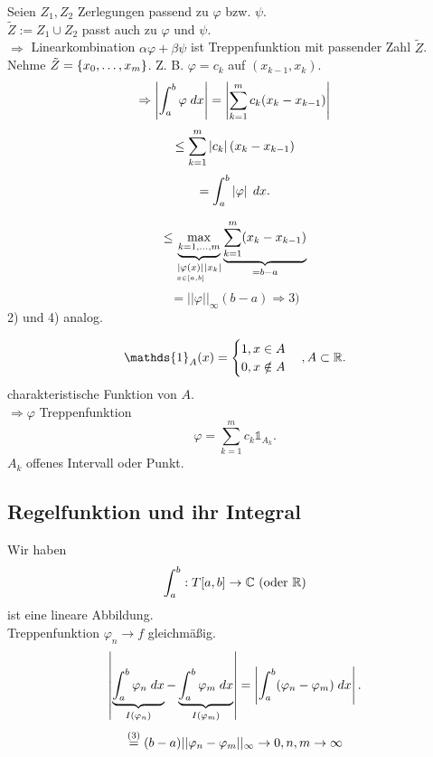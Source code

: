 \documentclass[../ana2.tex]{subfiles}
\begin{document}
\begin{bew}
    Seien \( Z_1, Z_2 \) Zerlegungen passend zu \( \varphi \) bzw. 
    \( \psi \).\\
    \( \tilde{Z} := Z_1 \cup Z_2 \) passt auch zu \( \varphi \) und 
    \( \psi \).\\
    \( \Rightarrow \) Linearkombination \( \alpha \varphi + \beta \psi \) 
    ist Treppenfunktion mit passender Zahl \( \tilde{Z} \).\\
    Nehme \( \tilde{Z} = \set{x_0,\ldots, x_m} \).
    Z. B. \( \varphi = c_k \) auf \( (x_{k-1}, x_k) \).
    \[ \Rightarrow \abs{ \integral{\varphi}{a}{b} } 
    = \abs{\sum_{k=1}^m c_k (x_k - x_{k-1}) } \]
    \[ \leq \sum_{k=1}^m \abs{c_k} (x_k - x_{k-1}) \]
    \[ = \integral{\abs{\varphi}}{a}{b}. \]

    \[ \leq \underbrace{\underset{k=1,\dots,m}{\max}}
    _{\underset{x \in [a,b]}{\abs{\varphi(x)}} \abs{x_k}}
    \underbrace{\sum_{k=1}^m (x_k-x_{k-1})}_{=b-a} \]
    \[ = ||\varphi||_\infty (b-a) \Rightarrow \text{3)} \]
    2) und 4) analog.
\end{bew}
\begin{bem}
    \[ \mathds{1}_A (x) = \begin{cases}
        1, x \in A \\
        0, x \notin A
    \end{cases}, A\subset \R. \]
    charakteristische Funktion von \(A\).\\
    \( \Rightarrow \varphi \) Treppenfunktion
    \[ \varphi = \sum_{k=1}^m c_k \mathds{1}_{A_k}. \]
    \( A_k \) offenes Intervall oder Punkt.
\end{bem}
\subsection{Regelfunktion und ihr Integral}
Wir haben 
\[ \abb{\int_a^b}{T[a,b]}{\C} \text{ (oder } \R \text{)} \]
ist eine lineare Abbildung.\\
Treppenfunktion \( \varphi_n \rightarrow f \) gleichmäßig.
\[ \abs{ \underbrace{\integral{\varphi_n} {a}{b}}_{I(\varphi_n)} 
- \underbrace{\integral{\varphi_m} {a}{b}}_{I(\varphi_m)} } 
= \abs{ \integral{(\varphi_n - \varphi_m)}{a}{b} }. \]
\[ \oversett{(3)}{=} (b-a) ||\varphi_n-\varphi_m||_\infty 
\rightarrow 0, n,m \rightarrow \infty \]
\end{document}
